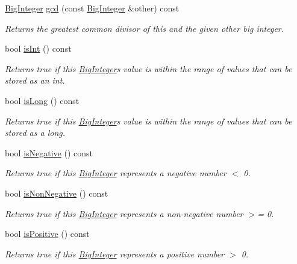 \begin{DoxyCompactItemize}
\mbox{\hyperlink{classBigInteger}{Big\+Integer}} \mbox{\hyperlink{classBigInteger_a7863ef61a27a110c2971b0011ebd74b9}{gcd}} (const \mbox{\hyperlink{classBigInteger}{Big\+Integer}} \&other) const
\begin{DoxyCompactList}\small\item\em Returns the greatest common divisor of this and the given other big integer. \end{DoxyCompactList}\item 
bool \mbox{\hyperlink{classBigInteger_a772efbf9d46b2e1e3840763a76307040}{is\+Int}} () const
\begin{DoxyCompactList}\small\item\em Returns true if this \mbox{\hyperlink{classBigInteger}{Big\+Integer}}\textquotesingle{}s value is within the range of values that can be stored as an int. \end{DoxyCompactList}\item 
bool \mbox{\hyperlink{classBigInteger_ae7ab3b45a738cd32270fcdea36953c7b}{is\+Long}} () const
\begin{DoxyCompactList}\small\item\em Returns true if this \mbox{\hyperlink{classBigInteger}{Big\+Integer}}\textquotesingle{}s value is within the range of values that can be stored as a long. \end{DoxyCompactList}\item 
bool \mbox{\hyperlink{classBigInteger_ac14adf29c832575388e1b999a4bd60f5}{is\+Negative}} () const
\begin{DoxyCompactList}\small\item\em Returns true if this \mbox{\hyperlink{classBigInteger}{Big\+Integer}} represents a negative number $<$ 0. \end{DoxyCompactList}\item 
bool \mbox{\hyperlink{classBigInteger_a2f8d83e07bed3c6477d597a01fc1213d}{is\+Non\+Negative}} () const
\begin{DoxyCompactList}\small\item\em Returns true if this \mbox{\hyperlink{classBigInteger}{Big\+Integer}} represents a non-\/negative number $>$= 0. \end{DoxyCompactList}\item 
bool \mbox{\hyperlink{classBigInteger_acaa49d84bd269a22c83b15966a483572}{is\+Positive}} () const
\begin{DoxyCompactList}\small\item\em Returns true if this \mbox{\hyperlink{classBigInteger}{Big\+Integer}} represents a positive number $>$ 0. \end{DoxyCompactList}\item 

\end{DoxyCompactItemize}
